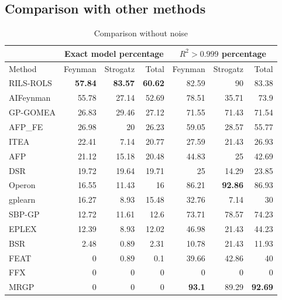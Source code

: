 \documentclass[a4paper,12pt]{elsarticle}
\begin{document}
\subsection{Comparison with other methods}

\begin{table}[!htb]
	\caption{Comparison without noise}\label{tab:comp_noise0}
	\centering
		\begin{tabular}{l|rrr|rrr} \hline
			& \multicolumn{3}{c|}{Exact model percentage} & \multicolumn{3}{c}{$R^2 > 0.999$ percentage}\\ \hline
			Method & Feynman & Strogatz & Total & Feynman & Strogatz & Total \\ \hline
			RILS-ROLS&\bf{57.84}&\bf{83.57}&\bf{60.62}&82.59&90&83.38\\
			AIFeynman&55.78&27.14&52.69&78.51&35.71&73.9\\
			GP-GOMEA&26.83&29.46&27.12&71.55&71.43&71.54\\
			AFP\_FE&26.98&20&26.23&59.05&28.57&55.77\\
			ITEA&22.41&7.14&20.77&27.59&21.43&26.93\\
			AFP&21.12&15.18&20.48&44.83&25&42.69\\
			DSR&19.72&19.64&19.71&25&14.29&23.85\\
			Operon&16.55&11.43&16&86.21&\bf{92.86}&86.93\\
			gplearn&16.27&8.93&15.48&32.76&7.14&30\\
			SBP-GP&12.72&11.61&12.6&73.71&78.57&74.23\\
			EPLEX&12.39&8.93&12.02&46.98&21.43&44.23\\
			BSR&2.48&0.89&2.31&10.78&21.43&11.93\\
			FEAT&0&0.89&0.1&39.66&42.86&40\\
			FFX&0&0&0&0&0&0\\
			MRGP&0&0&0&\bf{93.1}&89.29&\bf{92.69}\\
			\hline
		\end{tabular}
\end{table}
\end{document}
